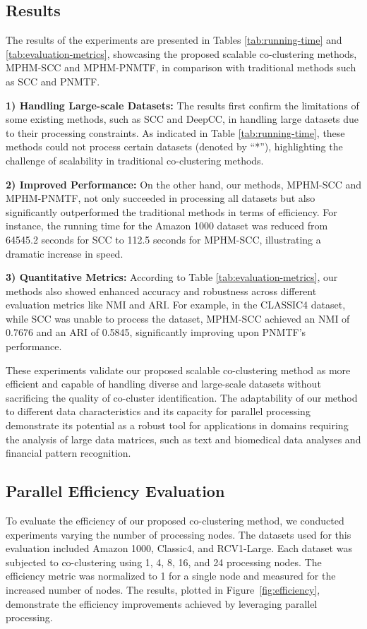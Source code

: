 \documentclass[journal]{IEEEtran}
\begin{document}
\subsection{Results}
The results of the experiments are presented in Tables \ref{tab:running-time} and \ref{tab:evaluation-metrics}, showcasing the proposed scalable co-clustering methods, MPHM-SCC and MPHM-PNMTF, in comparison with traditional methods such as SCC and PNMTF.

\textbf{1) Handling Large-scale Datasets:} The results first confirm the limitations of some existing methods, such as SCC and DeepCC, in handling large datasets due to their processing constraints. As indicated in Table \ref{tab:running-time}, these methods could not process certain datasets (denoted by ``*''), highlighting the challenge of scalability in traditional co-clustering methods.

\textbf{2) Improved Performance:} On the other hand, our methods, MPHM-SCC and MPHM-PNMTF, not only succeeded in processing all datasets but also significantly outperformed the traditional methods in terms of efficiency. For instance, the running time for the Amazon 1000 dataset was reduced from 64545.2 seconds for SCC to 112.5 seconds for MPHM-SCC, illustrating a dramatic increase in speed.

\textbf{3) Quantitative Metrics:} According to Table \ref{tab:evaluation-metrics}, our methods also showed enhanced accuracy and robustness across different evaluation metrics like NMI and ARI. For example, in the CLASSIC4 dataset, while SCC was unable to process the dataset, MPHM-SCC achieved an NMI of 0.7676 and an ARI of 0.5845, significantly improving upon PNMTF's performance.

These experiments validate our proposed scalable co-clustering method as more efficient and capable of handling diverse and large-scale datasets without sacrificing the quality of co-cluster identification. The adaptability of our method to different data characteristics and its capacity for parallel processing demonstrate its potential as a robust tool for applications in domains requiring the analysis of large data matrices, such as text and biomedical data analyses and financial pattern recognition.

\subsection{Parallel Efficiency Evaluation}
To evaluate the efficiency of our proposed co-clustering method, we conducted experiments varying the number of processing nodes. The datasets used for this evaluation included Amazon 1000, Classic4, and RCV1-Large. Each dataset was subjected to co-clustering using 1, 4, 8, 16, and 24 processing nodes. The efficiency metric was normalized to 1 for a single node and measured for the increased number of nodes. The results, plotted in Figure~\ref{fig:efficiency}, demonstrate the efficiency improvements achieved by leveraging parallel processing.
\end{document}
